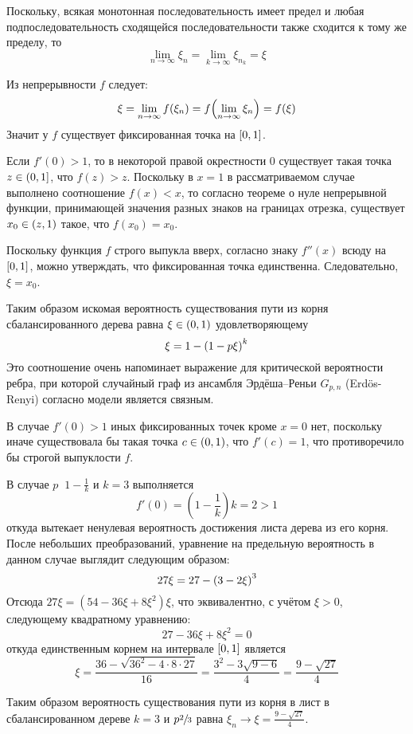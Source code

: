 \documentclass[a4paper]{article}
\let\originalleft\left
\let\originalright\right
\renewcommand{\left}{\mathopen{}\mathclose\bgroup\originalleft}
\renewcommand{\right}{\aftergroup\egroup\originalright}
\newcommand{\clo}[1]{{\left [ #1 \right ]}}
\newcommand{\ploc}[1]{{\left ( #1 \right ]}}
\newcommand{\brac}[1]{{\left ( #1 \right )}}
\newcommand{\defn}{{\mathop{\overset{\Delta}{=}}\nolimits}}
\newcommand{\eng}[1]{\foreignlanguage{english}{#1}}
\begin{document}
Поскольку, всякая монотонная последовательность имеет предел и
любая подпоследовательность сходящейся последовательности также
сходится к тому же пределу, то
\[\lim_{n\to \infty} \xi_n = \lim_{k\to \infty} \xi_{n_k} = \xi \]

Из непрерывности $f$ следует:
\[\xi = \lim_{n\to \infty} f(\xi_n) = f\brac{\lim_{n \to\infty}\xi_n} = f(\xi)\]
Значит у $f$ существует фиксированная точка на $\clo{0,1}$.

Если $f'(0)>1$, то в некоторой правой окрестности $0$ существует
такая точка $z\in\ploc{0,1}$, что $f(z)>z$. Поскольку в $x=1$ в
рассматриваемом случае выполнено соотношение $f(x)<x$, то согласно
теореме о нуле непрерывной функции, принимающей значения разных
знаков на границах отрезка, существует $x_0\in \brac{z,1}$ такое, что $f(x_0) = x_0$.

Поскольку функция $f$ строго выпукла вверх, согласно знаку $f''(x)$ всюду на $\clo{0,1}$, можно утверждать, что фиксированная точка единственна. Следовательно, $\xi=x_0$.

Таким образом искомая вероятность существования пути из корня
сбалансированного дерева равна $\xi\in \brac{0,1}$ удовлетворяющему
\[\xi = 1 - \brac{1 - p \xi }^k\]
Это соотношение очень напоминает выражение для критической
вероятности ребра, при которой случайный граф из ансамбля
Эрдёша–Реньи $G_{p,n}$ (\eng{Erd\"os-Renyi}) согласно модели
является связным.

В случае $f'(0)>1$ иных фиксированных точек кроме $x=0$ нет,
поскольку иначе существовала бы такая точка $c\in \brac{0,1}$,
что $f'(c)=1$, что противоречило бы строгой выпуклости $f$.

В случае $p\defn 1-\frac{1}{k}$ и $k=3$ выполняется
\[f'(0) = (1-\frac{1}{k}) k = 2 > 1 \]
откуда вытекает ненулевая вероятность достижения листа дерева из его
корня.
После небольших преобразований, уравнение на предельную вероятность
в данном случае выглядит следующим образом:
\[27 \xi = 27 - \brac{ 3 - 2 \xi }^3\]
Отсюда $27 \xi = ( 54 - 36 \xi + 8 \xi^2 )\xi$, что эквивалентно, с
учётом $\xi>0$, следующему квадратному уравнению:
\[27 - 36 \xi + 8 \xi^2 = 0\]
откуда единственным корнем на интервале $\clo{0,1}$ является
\[\xi = \frac{36 - \sqrt{ 36^2 - 4 \cdot 8\cdot 27}}{16}
= \frac{3^2 - 3 \sqrt{ 9-6 }}{4} = \frac{9 - \sqrt{ 27 }}{4}\]

Таким образом вероятность существования пути из корня в лист в
сбалансированном дереве $k=3$ и $p\sfrac{2}{3}$ равна
$\xi_n \to \xi = \frac{9 - \sqrt{ 27 }}{4}$.

\end{document}
